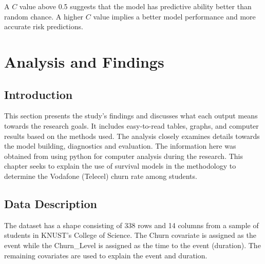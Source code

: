 \documentclass[doublespacing]{report} [12px]%
\begin{document}
A \(C\) value above 0.5 suggests that the model has predictive ability better than random chance. A higher \(C\) value implies a better model performance and more accurate risk predictions.



\newpage
\chapter{Analysis and Findings}
\section{Introduction}

This section presents the study's findings and discusses what each output means towards the research goals. It includes easy-to-read tables, graphs, and computer results based on the methods used. The analysis closely examines details towards the model building, diagnostics and evaluation. The information here was obtained from using python for computer analysis during the research. This chapter seeks to explain the use of survival models in the methodology to determine the Vodafone (Telecel) churn rate among students.

\section{Data Description}

The dataset has a shape consisting of 338 rows and 14 columns from a sample of students in KNUST's College of Science. The Churn covariate is assigned as the event while the Churn\_Level is assigned as the time to the event (duration). The remaining covariates are used to explain the event and duration.
\end{document}
